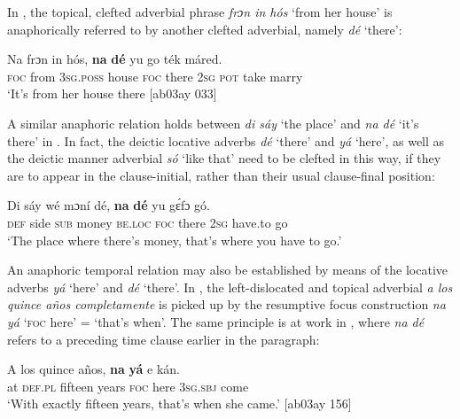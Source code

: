 In , the topical, clefted adverbial phrase \textit{frɔn in hós} ‘from her house’ is anaphorically referred to by another clefted adverbial, namely \textit{dé} ‘there’: 



\ea%
    \label{ex:key:717}
    \gll Na  frɔn    in    hós,    \textbf{na}  \textbf{dé}    yu  go  ték    máred.\\
\textsc{foc}  from  \textsc{3sg.poss}  house  \textsc{foc}  there  \textsc{2sg}  \textsc{pot}  take    marry\\

\glt ‘It’s from her house there [ab03ay 033]
\z

A similar anaphoric relation holds between \textit{di sáy} ‘the place’ and \textit{na dé} ‘it’s there’ in . In fact, the deictic locative adverbs \textit{dé} ‘there’ and \textit{yá} ‘here’, as well as the deictic manner adverbial \textit{só} ‘like that’ need to be clefted in this way, if they are to appear in the clause-initial, rather than their usual clause-final position:


\ea%
    \label{ex:key:718}
    \gll Di  sáy  wé  mɔní  dé,    \textbf{na}  \textbf{dé}    yu  gɛ́fɔ    gó.\\
\textsc{def}  side   \textsc{sub}  money  \textsc{be.loc}  \textsc{foc}  there  \textsc{2sg}  have.to  go\\

\glt ‘The place where there’s money, that’s where you have to go.’
\z

An anaphoric temporal relation may also be established by means of the locative adverbs \textit{yá} ‘here’ and \textit{dé} ‘there’. In , the left-dislocated and topical  adverbial \textit{a los quince años completamente} is picked up by the resumptive focus construction \textit{na yá} ‘\textsc{foc} here’ = ‘that’s when’. The same principle is at work in , where \textit{na dé} refers to a preceding time clause earlier in the paragraph: 


\ea%
    \label{ex:key:719}
    \gll A  los    quince  años,  \textbf{na}  \textbf{yá}   e    kán.\\
at  \textsc{def.pl}  fifteen  years  \textsc{foc}  here    \textsc{3sg.sbj}  come\\

\glt ‘With exactly fifteen years, that’s when she came.’ [ab03ay 156]
\z


